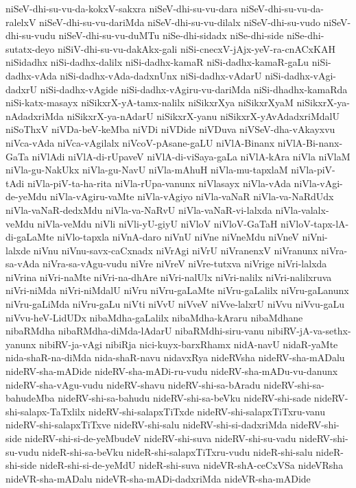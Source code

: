 {niSeV-dhi-su-vu-da-kokxV-sakxra
niSeV-dhi-su-vu-dara
niSeV-dhi-su-vu-da-ralelxV
niSeV-dhi-su-vu-dariMda
niSeV-dhi-su-vu-dilalx
niSeV-dhi-su-vudo
niSeV-dhi-su-vudu
niSeV-dhi-su-vu-duMTu
niSe-dhi-sidadx
niSe-dhi-side
niSe-dhi-sutatx-deyo
niSiV-dhi-su-vu-dakAkx-gali
niSi-cnecxV-jAjx-yeV-ra-cnACxKAH
niSidadhx
niSi-dadhx-dalilx
niSi-dadhx-kamaR
niSi-dadhx-kamaR-gaLu
niSi-dadhx-vAda
niSi-dadhx-vAda-dadxnUnx
niSi-dadhx-vAdarU
niSi-dadhx-vAgi-dadxrU
niSi-dadhx-vAgide
niSi-dadhx-vAgiru-vu-dariMda
niSi-dhadhx-kamaRda
niSi-katx-masayx
niSikxrX-yA-tamx-nalilx
niSikxrXya
niSikxrXyaM
niSikxrX-ya-nAdadxriMda
niSikxrX-ya-nAdarU
niSikxrX-yanu
niSikxrX-yAvAdadxriMdalU
niSoThxV
niVDa-beV-keMba
niVDi
niVDide
niVDuva
niVSeV-dha-vAkayxvu
niVca-vAda
niVca-vAgilalx
niVcoV-pAsane-gaLU
niVlA-Binanx
niVlA-Bi-nanx-GaTa
niVlAdi
niVlA-di-rUpaveV
niVlA-di-viSaya-gaLa
niVlA-kAra
niVla
niVlaM
niVla-gu-NakUkx
niVla-gu-NavU
niVla-mAhuH
niVla-mu-tapxlaM
niVla-piV-tAdi
niVla-piV-ta-ha-rita
niVla-rUpa-vanunx
niVlasayx
niVla-vAda
niVla-vAgi-de-yeMdu
niVla-vAgiru-vaMte
niVla-vAgiyo
niVla-vaNaR
niVla-va-NaRdUdx
niVla-vaNaR-dedxMdu
niVla-va-NaRvU
niVla-vaNaR-vi-lalxda
niVla-valalx-veMdu
niVla-veMdu
niVli
niVli-yU-giyU
niVloV
niVloV-GaTaH
niVloV-tapx-lA-di-gaLaMte
niVlo-tapxla
niVnA-daro
niVnU
niVne
niVneMdu
niVneV
niVni-lalxde
niVnu
niVnu-savx-caCxnadx
niVrAgi
niVrU
niVranenxV
niVranunx
niVra-sa-vAda
niVra-sa-vAgu-vudu
niVre
niVreV
niVre-tutxva
niVrige
niVri-lalxda
niVrina
niVri-naMte
niVri-na-dhAre
niVri-nalUlx
niVri-nalilx
niVri-nalilxruva
niVri-niMda
niVri-niMdalU
niVru
niVru-gaLaMte
niVru-gaLalilx
niVru-gaLanunx
niVru-gaLiMda
niVru-gaLu
niVti
niVvU
niVveV
niVve-lalxrU
niVvu
niVvu-gaLu
niVvu-heV-LidUDx
nibaMdha-gaLalilx
nibaMdha-kAraru
nibaMdhane
nibaRMdha
nibaRMdha-diMda-lAdarU
nibaRMdhi-siru-vanu
nibiRV-jA-va-sethx-yanunx
nibiRV-ja-vAgi
nibiRja
nici-kuyx-barxRhamx
nidA-navU
nidaR-yaMte
nida-shaR-na-diMda
nida-shaR-navu
nidavxRya
nideRVsha
nideRV-sha-mADalu
nideRV-sha-mADide
nideRV-sha-mADi-ru-vudu
nideRV-sha-mADu-vu-danunx
nideRV-sha-vAgu-vudu
nideRV-shavu
nideRV-shi-sa-bAradu
nideRV-shi-sa-bahudeMba
nideRV-shi-sa-bahudu
nideRV-shi-sa-beVku
nideRV-shi-sade
nideRV-shi-salapx-TaTxlilx
nideRV-shi-salapxTiTxde
nideRV-shi-salapxTiTxru-vanu
nideRV-shi-salapxTiTxve
nideRV-shi-salu
nideRV-shi-si-dadxriMda
nideRV-shi-side
nideRV-shi-si-de-yeMbudeV
nideRV-shi-suva
nideRV-shi-su-vadu
nideRV-shi-su-vudu
nideR-shi-sa-beVku
nideR-shi-salapxTiTxru-vudu
nideR-shi-salu
nideR-shi-side
nideR-shi-si-de-yeMdU
nideR-shi-suva
nideVR-shA-ceCxVSa
nideVRsha
nideVR-sha-mADalu
nideVR-sha-mADi-dadxriMda
nideVR-sha-mADide
}

